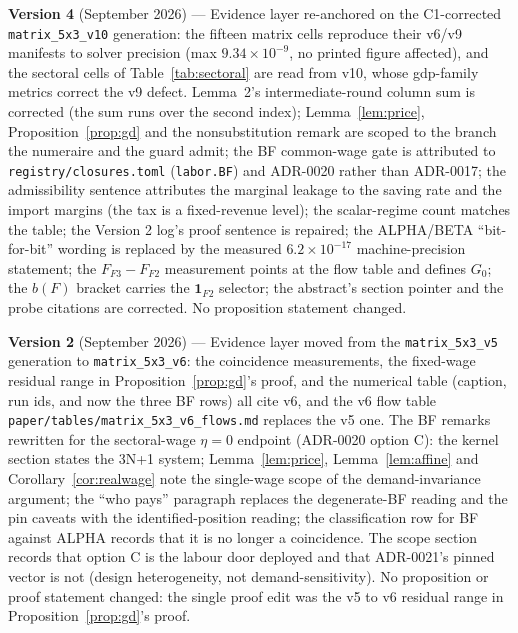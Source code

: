 \documentclass[11pt]{article}
\numberwithin{equation}{section}
\begin{document}
\noindent\textbf{Version 4} \textcolor{revisionV3}{(September 2026)} ---
Evidence layer re-anchored on the C1-corrected \texttt{matrix\_5x3\_v10}
generation: the fifteen matrix cells reproduce their v6/v9 manifests to solver
precision (max $9.34\times10^{-9}$, no printed figure affected), and the
sectoral cells of Table~\ref{tab:sectoral} are read from v10, whose gdp-family
metrics correct the v9 defect. Lemma~2's intermediate-round column sum is
corrected (the sum runs over the second index); Lemma~\ref{lem:price},
Proposition~\ref{prop:gd} and the nonsubstitution remark are scoped to the
branch the numeraire and the guard admit; the BF common-wage gate is attributed
to \texttt{registry/closures.toml} (\texttt{labor.BF}) and ADR-0020 rather than
ADR-0017; the admissibility sentence attributes the marginal leakage to the
saving rate and the import margins (the tax is a fixed-revenue level); the
scalar-regime count matches the table; the Version 2 log's proof sentence is
repaired; the ALPHA/BETA ``bit-for-bit'' wording is replaced by the measured
$6.2\times10^{-17}$ machine-precision statement; the $F_{F3}-F_{F2}$
measurement points at the flow table and defines $G_0$; the $b(F)$ bracket
carries the $\mathbf{1}_{F2}$ selector; the abstract's section pointer and the
probe citations are corrected. No proposition statement changed.

\noindent\textbf{Version 2} \textcolor{revisionV1}{(September 2026)} ---
Evidence layer moved from the \texttt{matrix\_5x3\_v5} generation to
\texttt{matrix\_5x3\_v6}: the coincidence measurements, the fixed-wage
residual range in Proposition~\ref{prop:gd}'s proof, and the numerical table
(caption, run ids, and now the three BF rows) all cite v6, and the v6 flow
table \texttt{paper/tables/matrix\_5x3\_v6\_flows.md} replaces the v5 one.
The BF remarks rewritten for the sectoral-wage $\eta = 0$ endpoint (ADR-0020
option C): the kernel section states the 3N+1 system; Lemma~\ref{lem:price},
Lemma~\ref{lem:affine} and Corollary~\ref{cor:realwage} note the
single-wage scope of the demand-invariance argument; the ``who pays''
paragraph replaces the degenerate-BF reading and the pin caveats with the
identified-position reading; the classification row for BF against ALPHA
records that it is no longer a coincidence. The scope section records that
option C is the labour door deployed and that ADR-0021's pinned vector is
not (design heterogeneity, not demand-sensitivity). \textcolor{revisionV3}{No
proposition or proof statement changed: the single proof edit was the v5 to v6
residual range in Proposition~\ref{prop:gd}'s proof.}
\end{document}
